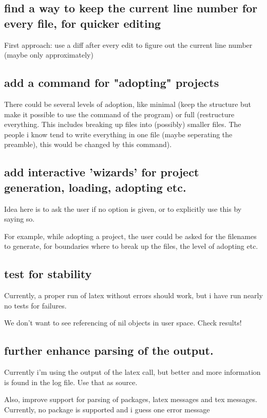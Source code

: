 \documentclass[parskip=half]{scrartcl}
\begin{document}
    \subsection{find a way to keep the current line number for every file, for quicker editing}
    First approach: use a diff after every edit to figure out the current line number (maybe only approximately)

    \subsection{add a command for "adopting" projects}
    There could be several levels of adoption, like minimal (keep the structure but make it possible to use the command of the program) or full (restructure
    everything. This includes breaking up files into (possibly) smaller files. The people i know tend to write everything in one file (maybe seperating the
    preamble), this would be changed by this command).

    \subsection{add interactive 'wizards' for project generation, loading, adopting etc.}
    Idea here is to ask the user if no option is given, or to explicitly use this by saying so.

    For example, while adopting a project, the user could be asked for the filenames to generate, for boundaries where to break up the files, the level of
    adopting etc.

    \subsection{test for stability}
    Currently, a proper run of latex without errors should work, but i have run nearly no tests for failures.

    We don't want to see referencing of nil objects in user space. Check results!

    \subsection{further enhance parsing of the output.}
    Currently i'm using the output of the latex call, but better and more information is found in the log file. Use that as source.

    Also, improve support for parsing of packages, latex messages and tex messages. Currently, no package is supported and i guess one error message
\end{document}
